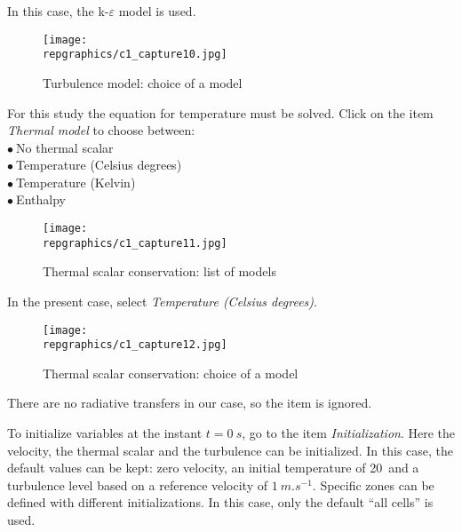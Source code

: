 \clearpage
In this case, the k-$\varepsilon$ model is used.

\begin{figure}[ht]
\begin{center}
\texttt{[image: \\repgraphics/c1\_capture10.jpg]}
\caption{Turbulence model: choice of a model}
\label{fig10_e1}
\end{center}
\end{figure}


\clearpage
For this study the equation for temperature must be solved. Click on the item
{\itshape Thermal model} to
choose between:\\
\hspace*{1cm}$\bullet\ $No thermal scalar\\
\hspace*{1cm}$\bullet\ $Temperature (Celsius degrees)\\
\hspace*{1cm}$\bullet\ $Temperature (Kelvin)\\
\hspace*{1cm}$\bullet\ $Enthalpy

\begin{figure}[ht]
\begin{center}
\texttt{[image: \\repgraphics/c1\_capture11.jpg]}
\caption{Thermal scalar conservation: list of models}
\label{fig11_e1}
\end{center}
\end{figure}


\clearpage
In the present case, select {\itshape Temperature (Celsius degrees)}.
\begin{figure}[ht]
\begin{center}
\texttt{[image: \\repgraphics/c1\_capture12.jpg]}
\caption{Thermal scalar conservation: choice of a model}
\label{fig12_e1}
\end{center}
\end{figure}

There are no radiative transfers in our case, so the item is ignored.

\clearpage
To initialize variables at the instant $t=0\ s$, go to the item {\itshape Initialization}.
Here the velocity, the thermal scalar and the turbulence can be initialized. In
this case, the default values can be kept: zero velocity, an initial temperature
of 20\degresC\ and a turbulence level based on a reference velocity of $1\
m.s^{-1}$. Specific zones can be defined with different initializations. In this
case, only the default ``all cells'' is used.

